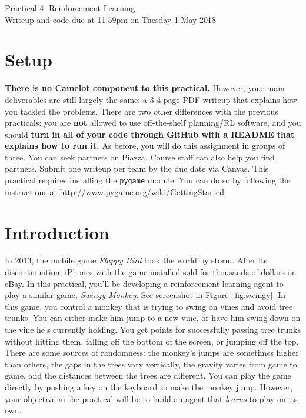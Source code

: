 \documentclass[12pt]{article}
\begin{document}
\begin{center}
{\Large Practical 4: Reinforcement Learning}\\
Writeup and code due at 11:59pm on Tuesday 1 May 2018\\
\end{center}

\section*{Setup}

{\bf There is no Camelot component to this practical.}  However, your main deliverables are still largely the same: a 3-4 page PDF writeup that explains how you tackled the problems.  There are two other differences with the previous practicals: you are \textbf{not} allowed to use off-the-shelf planning/RL software, and you should {\bf turn in all of your code through GitHub with a README that explains how to run it.} As before, you will do this assignment in groups of three.  You can seek partners on Piazza.  Course staff can also help you find partners. Submit one writeup per team by the due date via Canvas.  This practical requires installing the \verb|pygame| module. You can do so by following the instructions at \url{http://www.pygame.org/wiki/GettingStarted}


\section*{Introduction}

In 2013, the mobile game \emph{Flappy Bird} took the world by storm.  After its discontinuation, iPhones with the game installed sold for thousands of dollars on eBay.  In this practical, you'll be developing a reinforcement learning agent to play a similar game, \emph{Swingy Monkey}.  See screenshot in Figure~\ref{fig:swingy}.  In this game, you control a monkey that is trying to swing on vines and avoid tree trunks.  You can either make him jump to a new vine, or have him swing down on the vine he's currently holding.  You get points for successfully passing tree trunks without hitting them, falling off the bottom of the screen, or jumping off the top.  There are some sources of randomness: the monkey's jumps are sometimes higher than others, the gaps in the trees vary vertically, the gravity varies from game to game, and the distances between the trees are different.  You can play the game directly by pushing a key on the keyboard to make the monkey jump.  However, your objective in the practical will be to build an agent that \emph{learns} to play on its own. 
\end{document}
